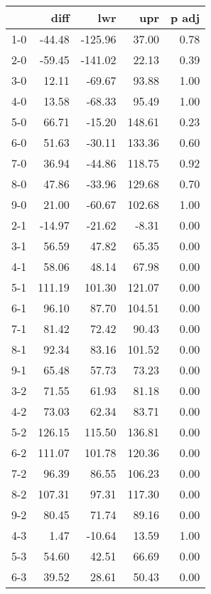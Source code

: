 \documentclass[10pt,a4paper]{article}
\begin{document}
\begin{table}[ht]
\centering
\begin{tabular}{rrrrr}
  \hline
 & diff & lwr & upr & p adj \\ 
  \hline
1-0 & -44.48 & -125.96 & 37.00 & 0.78 \\ 
  2-0 & -59.45 & -141.02 & 22.13 & 0.39 \\ 
  3-0 & 12.11 & -69.67 & 93.88 & 1.00 \\ 
  4-0 & 13.58 & -68.33 & 95.49 & 1.00 \\ 
  5-0 & 66.71 & -15.20 & 148.61 & 0.23 \\ 
  6-0 & 51.63 & -30.11 & 133.36 & 0.60 \\ 
  7-0 & 36.94 & -44.86 & 118.75 & 0.92 \\ 
  8-0 & 47.86 & -33.96 & 129.68 & 0.70 \\ 
  9-0 & 21.00 & -60.67 & 102.68 & 1.00 \\ 
  2-1 & -14.97 & -21.62 & -8.31 & 0.00 \\ 
  3-1 & 56.59 & 47.82 & 65.35 & 0.00 \\ 
  4-1 & 58.06 & 48.14 & 67.98 & 0.00 \\ 
  5-1 & 111.19 & 101.30 & 121.07 & 0.00 \\ 
  6-1 & 96.10 & 87.70 & 104.51 & 0.00 \\ 
  7-1 & 81.42 & 72.42 & 90.43 & 0.00 \\ 
  8-1 & 92.34 & 83.16 & 101.52 & 0.00 \\ 
  9-1 & 65.48 & 57.73 & 73.23 & 0.00 \\ 
  3-2 & 71.55 & 61.93 & 81.18 & 0.00 \\ 
  4-2 & 73.03 & 62.34 & 83.71 & 0.00 \\ 
  5-2 & 126.15 & 115.50 & 136.81 & 0.00 \\ 
  6-2 & 111.07 & 101.78 & 120.36 & 0.00 \\ 
  7-2 & 96.39 & 86.55 & 106.23 & 0.00 \\ 
  8-2 & 107.31 & 97.31 & 117.30 & 0.00 \\ 
  9-2 & 80.45 & 71.74 & 89.16 & 0.00 \\ 
  4-3 & 1.47 & -10.64 & 13.59 & 1.00 \\ 
  5-3 & 54.60 & 42.51 & 66.69 & 0.00 \\ 
  6-3 & 39.52 & 28.61 & 50.43 & 0.00 \\ 

\end{tabular}
\end{table}
\end{document}

